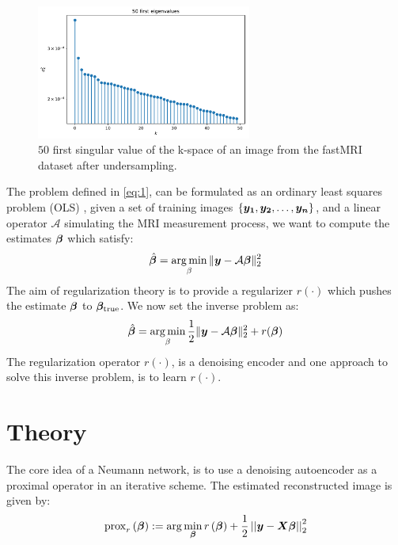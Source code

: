 \documentclass{article}
\begin{document}
	\begin{figure}[H]
		\centering
		\captionsetup{justification=centering}
		\includegraphics[width=200pt]{variance_plot_log.pdf}
		\caption{$50$ first singular value of the k-space of an image from the fastMRI dataset after undersampling.}
	\end{figure}
The problem defined in \eqref{eq:1}, can be formulated as an ordinary least squares problem (OLS) , given a set of training images $\{\bm{y_1}, \bm{y_2}, \ldots, \bm{y_n}\}$, and a linear operator $\mathcal{A}$ simulating the MRI measurement process, we want to compute the estimates 
$\bm{\beta}$ which satisfy:
$$
\hat{\bm{\beta}}  =  \operatorname*{arg\,min}_{\beta} \| \bm{y} -\mathcal{A} \bm{\beta} \|_2^2
$$
The aim of regularization theory is to provide a regularizer $r(\cdot)$ which pushes the estimate $\bm{\beta}$ to $\bm{\beta}_{\text{true}}$. We now set the inverse problem as:
$$
\hat{\bm{\beta}}  =  \operatorname*{arg\,min}_{\beta} \frac{1}{2} \| \bm{y} -\mathcal{A} \bm{\beta} \|_2^2 + r(\bm{\beta})
$$
The regularization operator $r(\cdot)$, is a denoising encoder and one approach to solve this inverse problem, is to learn $r(\cdot)$. 
 
\section{Theory}
\label{Theory}

The core idea of a Neumann network, is to use a denoising autoencoder as a proximal operator in an iterative scheme.
The estimated reconstructed image is given by:
\begin{equation}
\operatorname{prox}_{r}\left( \bm{\beta} \right) := \arg \min_{\bm{\beta}} r\left( \bm{\beta} \right)+ \frac{1}{2} \left|\left| \bm{y}-\bm{X}\bm{\beta} \right|\right| _{2}^2  \label{eq:2}
\end{equation}
\end{document}
